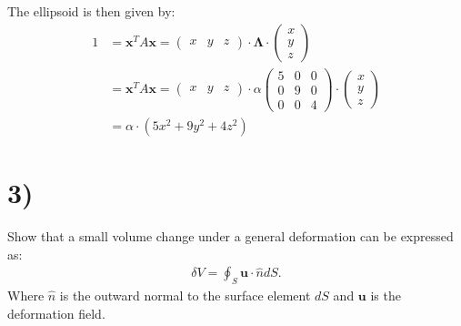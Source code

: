 \documentclass{article}
\begin{document}
The ellipsoid is then given by:
\begin{align*}
    1&=\mathbf{x}^TA\mathbf{x} = \begin{pmatrix}
        x&y&z
    \end{pmatrix}\cdot\mathbf{\Lambda}\cdot\begin{pmatrix}
        x\\
        y\\
        z
    \end{pmatrix}\\
    &=\mathbf{x}^TA\mathbf{x} = \begin{pmatrix}
        x&y&z
    \end{pmatrix}\cdot\alpha\begin{pmatrix}
        5&0&0\\
        0&9&0\\
        0&0&4
    \end{pmatrix}\cdot\begin{pmatrix}
        x\\
        y\\
        z
    \end{pmatrix}\\
    &= \alpha\cdot(5x^2 + 9y^2 + 4z^2)
\end{align*}
\begin{comment}
\begin{center}
    \begin{tikzpicture}
        \begin{axis}
            \addplot3[surf,] {( 9*x^2 + 5*y^2 -1 )*1/4};
        \end{axis}
    \end{tikzpicture}
\end{center}
\end{comment}



\section*{3)}
Show that a small volume change under a general deformation can be expressed as:
\begin{align*}
    \delta V = \oint_S \mathbf{u}\cdot\hat{n}dS.
\end{align*}Where $\hat{n}$ is the outward normal to the surface element $dS$ and $\mathbf{u}$ is the deformation field.
\end{document}
